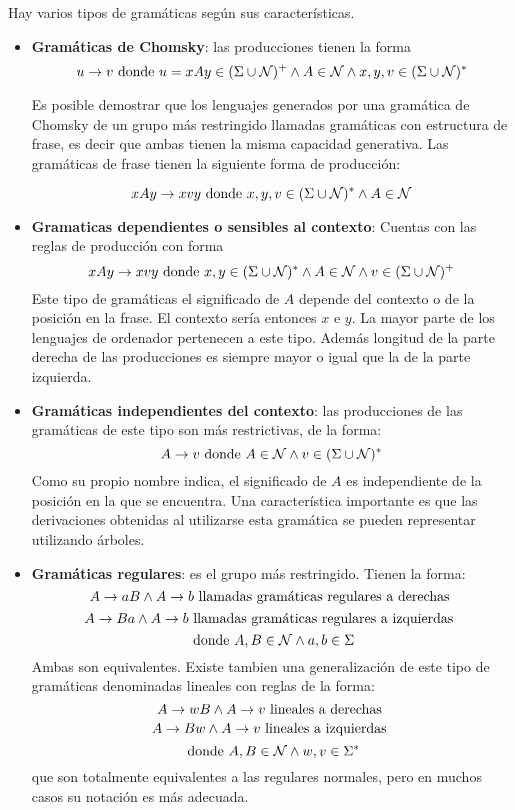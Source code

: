 Hay varios tipos de gramáticas según sus características.
\begin{itemize}
\item \textbf{Gramáticas de Chomsky}: las producciones tienen la forma \[u \rightarrow v \textup{ donde } u=xAy \in (\Sigma \cup \mathcal{N})^{+} \wedge A \in \mathcal{N} \wedge x, y, v \in (\Sigma \cup \mathcal{N})^{*}\]

Es posible demostrar que los lenguajes generados por una gramática de Chomsky de un grupo más restringido llamadas gramáticas con estructura de frase, es decir que ambas tienen la misma capacidad generativa. Las gramáticas de frase tienen la siguiente forma de producción:

\[xAy \rightarrow xvy \textup{ donde } x,y,v \in (\Sigma \cup \mathcal{N})^{*} \wedge A \in \mathcal{N}\]
\item \textbf{Gramaticas dependientes o sensibles al contexto}: Cuentas con las reglas de producción con forma  \[xAy \rightarrow xvy \textup{ donde } x, y \in (\Sigma \cup \mathcal{N})^{*} \wedge A \in \mathcal{N} \wedge v \in (\Sigma \cup \mathcal{N})^{+}\]
Este tipo de gramáticas el significado de $A$ depende del contexto o de la posición en la frase. El contexto sería entonces $x$ e $y$. La mayor parte de los lenguajes de ordenador pertenecen a este tipo. Además longitud de la parte derecha de las producciones es siempre mayor o igual que la de la parte izquierda.
\item \textbf{Gramáticas independientes del contexto}: las producciones de las gramáticas de este tipo son más restrictivas, de la forma: 
\[A \rightarrow v \textup{ donde } A \in \mathcal{N} \wedge v \in (\Sigma \cup \mathcal{N})^{*}\]
Como su propio nombre indica, el significado de $A$ es independiente de la posición en la que se encuentra. Una característica importante es que las derivaciones obtenidas al utilizarse esta gramática se pueden representar utilizando árboles.

\item \textbf{Gramáticas regulares}: es el grupo más restringido. Tienen la forma: \[A \rightarrow aB \wedge A \rightarrow b \textup{ llamadas gramáticas regulares a derechas } \]
\[A \rightarrow Ba \wedge A \rightarrow b \textup{ llamadas gramáticas regulares a izquierdas } \]
\[ \textup{ donde }A, B \in \mathcal{N} \wedge a,b \in \Sigma  \]
Ambas son equivalentes. Existe tambien una generalización de este tipo de gramáticas denominadas lineales con reglas de la forma: \[A \rightarrow wB \wedge A \rightarrow v \textup{ lineales a derechas } \]
\[A \rightarrow Bw \wedge A \rightarrow v \textup{ lineales a izquierdas } \]
\[ \textup{ donde }A, B \in \mathcal{N} \wedge w,v \in \Sigma^{*}  \]
que son totalmente equivalentes a las regulares normales, pero en muchos casos su notación es más adecuada.
\end{itemize}

